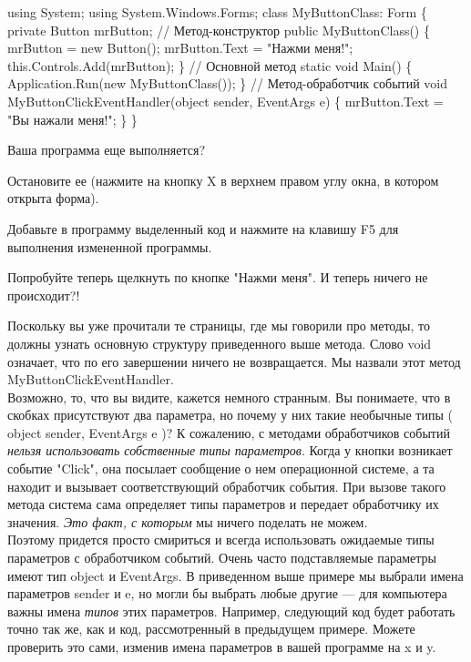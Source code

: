 \documentclass[12pt, a4paper]{article}
\begin{document}
\begin{spverbatim}using System;
using System.Windows.Forms;
class MyButtonClass: Form
\{
    private Button mrButton;
    // Метод-конструктор
    public MyButtonClass()
    \{
        mrButton = new Button();
        mrButton.Text = "Нажми меня!";
        this.Controls.Add(mrButton);
    \}
    // Основной метод
    static void Main()
    \{
        Application.Run(new MyButtonClass());
    \}
    // Метод-обработчик событий
    void MyButtonClickEventHandler(object sender, EventArgs e)
    \{
        mrButton.Text = "Вы нажали меня!";
    \}
\}\end{spverbatim}

Ваша программа еще выполняется?\\

\begin{itemize} {
\item{Остановите ее (нажмите на кнопку X в верхнем правом углу окна, в котором открыта форма).}
\item{Добавьте в программу выделенный код и нажмите на клавишу F5 для выполнения измененной программы.}
\item{Попробуйте теперь щелкнуть по кнопке "Нажми меня". И теперь ничего не происходит?!}
} \end{itemize}

Поскольку вы уже прочитали те страницы, где мы говорили про методы, то должны узнать основную структуру приведенного выше метода. Слово void  означает, что по его завершении ничего не возвращается. Мы назвали этот метод MyButtonClickEventHandler.\\

Возможно, то, что вы видите, кажется немного странным. Вы понимаете, что в скобках присутствуют два параметра, но почему у них такие необычные типы ( object sender, EventArgs e )? К сожалению, с методами обработчиков событий \textit{нельзя использовать собственные типы параметров}. Когда у кнопки возникает событие "Click", она посылает сообщение о нем операционной системе, а та находит и вызывает соответствующий обработчик события. При вызове такого метода система сама определяет типы параметров и передает обработчику их значения. \textit{Это факт, с которым}  мы ничего поделать не можем.\\

Поэтому придется просто смириться и всегда использовать ожидаемые типы параметров с обработчиком событий. Очень часто подставляемые параметры имеют тип object  и EventArgs. В приведенном выше примере мы выбрали имена параметров sender  и e, но могли бы выбрать любые другие — для компьютера важны имена \textit{типов}  этих параметров. Например, следующий код будет работать точно так же, как и код, рассмотренный в предыдущем примере. Можете проверить это сами, изменив имена параметров в вашей программе на x  и y.\\
\end{document}
